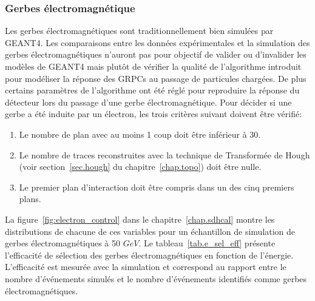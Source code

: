\subsubsection{Gerbes électromagnétique}
 Les gerbes électromagnétiques sont traditionnellement bien simulées par GEANT4. Les comparaisons entre les données expérimentales et la simulation des gerbes électromagnétiques n'auront pas pour objectif de valider ou d'invalider les modèles de GEANT4 mais plutôt de vérifier la qualité de l'algorithme introduit pour modéliser la réponse des GRPCs au passage de particules chargées. De plus certains paramètres de l’algorithme ont été réglé pour reproduire la réponse du détecteur lors du passage d'une gerbe électromagnétique.
Pour décider si une gerbe a été induite par un électron, les trois critères suivant doivent être vérifié:
\begin{enumerate}[~~1-]
\item Le nombre de plan avec au moins 1 coup doit être inférieur à 30.%
\item Le nombre de traces reconstruites avec la technique de Transformée de Hough (voir section~\ref{sec.hough} du chapitre~\ref{chap.topo}) doit être nulle. %
\item Le premier plan d’interaction doit être compris dans un des cinq premiers plans.%
\end{enumerate}
La figure~\ref{fig:electron_control} dans le chapitre~\ref{chap.sdhcal} montre les distributions de chacune de ces variables pour un échantillon de simulation de gerbes électromagnétiques à 50 $GeV$. Le tableau~\ref{tab.e_sel_eff} présente l'efficacité de sélection des gerbes électromagnétiques en fonction de l'énergie. L'efficacité est mesurée avec la simulation et correspond au rapport entre le nombre d'événements simulés et le nombre d'événements identifiés comme gerbes électromagnétiques.
